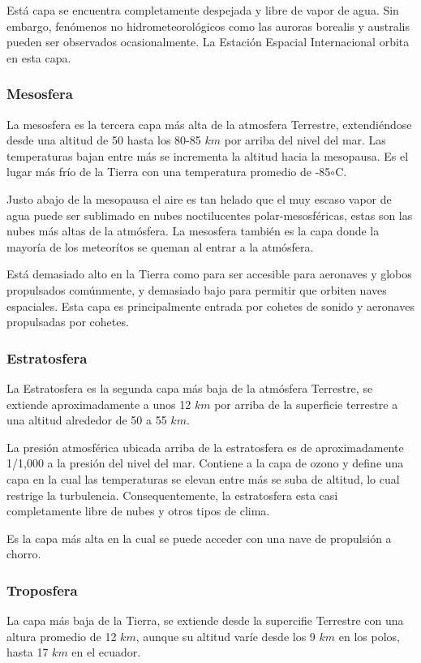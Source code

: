 \documentclass{article} %
\begin{document}
	Está capa se encuentra completamente despejada y libre de vapor de agua. Sin embargo, fenómenos no hidrometeorológicos como las auroras borealis y australis pueden ser observados ocasionalmente. La Estación Espacial Internacional orbita en esta capa.
	
    \subsubsection{Mesosfera}
    La mesosfera es la tercera capa más alta de la atmosfera Terrestre, extendiéndose desde una altitud de 50 hasta los 80-85 $km$ por arriba del nivel del mar. Las temperaturas bajan entre más se incrementa la altitud hacia la mesopausa. Es el lugar más frío de la Tierra con una temperatura promedio de -85$\circ$C.
    
    Justo abajo de la mesopausa el aire es tan helado que el muy escaso vapor de agua puede ser sublimado en nubes noctilucentes polar-mesosféricas, estas son las nubes más altas de la atmósfera. La mesosfera también es la capa donde la mayoría de los meteorítos se queman al entrar a la atmósfera. 
    
    Está demasiado alto en la Tierra como para ser accesible para aeronaves y globos propulsados comúnmente, y demasiado bajo para permitir que orbiten naves espaciales. Esta capa es principalmente entrada por cohetes de sonido y aeronaves propulsadas por cohetes.
     
     \subsubsection{Estratosfera}
     La Estratosfera es la segunda capa más baja de la atmósfera Terrestre, se extiende aproximadamente a unos 12 $km$ por arriba de la superficie terrestre a una altitud alrededor de 50 a 55 $km$.
     
     La presión atmosférica ubicada arriba de la estratosfera es de aproximadamente 1/1,000 a la presión del nivel del mar. Contiene a la capa de ozono y define una capa en la cual las temperaturas se elevan entre más se suba de altitud, lo cual restrige la turbulencia. Consequentemente, la estratosfera esta casi completamente libre de nubes y otros tipos de clima.
     
     Es la capa más alta en la cual se puede acceder con una nave de propulsión a chorro.
     
     \subsubsection{Troposfera}
     La capa más baja de la Tierra, se extiende desde la supercifie Terrestre con una altura promedio de 12 $km$, aunque su altitud varíe desde los 9 $km$ en los polos, hasta 17 $km$ en el ecuador.
     
\end{document}
